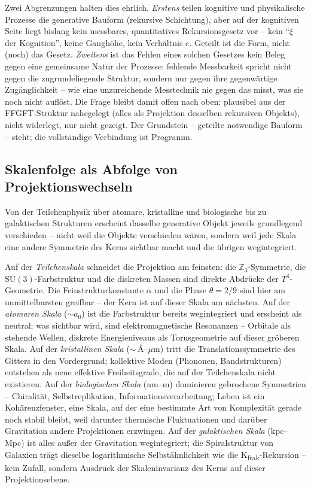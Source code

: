 Zwei Abgrenzungen halten dies ehrlich. \emph{Erstens} teilen kognitive und
physikalische Prozesse die generative Bauform (rekursive Schichtung), aber
auf der kognitiven Seite liegt bislang kein messbares, quantitatives
Rekursionsgesetz vor -- kein \enquote{$\xi$ der Kognition}, keine Ganghöhe,
kein Verhältnis $e$. Geteilt ist die Form, nicht (noch) das Gesetz.
\emph{Zweitens} ist das Fehlen eines solchen Gesetzes kein Beleg gegen eine
gemeinsame Natur der Prozesse: fehlende Messbarkeit spricht nicht gegen die
zugrundeliegende Struktur, sondern nur gegen ihre gegenwärtige Zugänglichkeit
-- wie eine unzureichende Messtechnik nie gegen das misst, was sie noch nicht
auflöst. Die Frage bleibt damit offen nach oben: plausibel aus der
FFGFT-Struktur nahegelegt (alles als Projektion desselben rekursiven
Objekts), nicht widerlegt, nur nicht gezeigt. Der Grundstein -- geteilte
notwendige Bauform -- steht; die vollständige Verbindung ist Programm.

\subsection*{Skalenfolge als Abfolge von Projektionswechseln}

Von der Teilchenphysik über atomare, kristalline und biologische bis zu
galaktischen Strukturen erscheint dasselbe generative Objekt jeweils
grundlegend verschieden -- nicht weil die Objekte verschieden wären, sondern
weil jede Skala eine andere Symmetrie des Kerns sichtbar macht und die
übrigen wegintegriert.

Auf der \emph{Teilchenskala} schneidet die Projektion am feinsten: die
$\mathbb{Z}_3$-Symmetrie, die $\mathrm{SU}(3)$-Farbstruktur und die diskreten
Massen sind direkte Abdrücke der $T^4$-Geometrie. Die Feinstrukturkonstante
$\alpha$ und die Phase $\theta = 2/9$ sind hier am unmittelbarsten greifbar --
der Kern ist auf dieser Skala am nächsten. Auf der \emph{atomaren Skala}
($\sim a_0$) ist die Farbstruktur bereits wegintegriert und erscheint als
neutral; was sichtbar wird, sind elektromagnetische Resonanzen -- Orbitale als
stehende Wellen, diskrete Energieniveaus als Torusgeometrie auf dieser
gröberen Skala. Auf der \emph{kristallinen Skala} ($\sim$\,Å--$\mu$m) tritt
die Translationssymmetrie des Gitters in den Vordergrund; kollektive Moden
(Phononen, Bandstrukturen) entstehen als neue effektive Freiheitsgrade, die
auf der Teilchenskala nicht existieren. Auf der \emph{biologischen Skala}
(nm--m) dominieren gebrochene Symmetrien -- Chiralität, Selbstreplikation,
Informationsverarbeitung; Leben ist ein Kohärenzfenster, eine Skala, auf der
eine bestimmte Art von Komplexität gerade noch stabil bleibt, weil darunter
thermische Fluktuationen und darüber Gravitation andere Projektionen
erzwingen. Auf der \emph{galaktischen Skala} (kpc--Mpc) ist alles außer der
Gravitation wegintegriert; die Spiralstruktur von Galaxien trägt dieselbe
logarithmische Selbstähnlichkeit wie die K\textsubscript{frak}-Rekursion --
kein Zufall, sondern Ausdruck der Skaleninvarianz des Kerns auf dieser
Projektionsebene.

